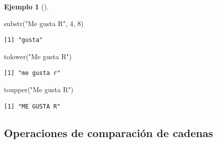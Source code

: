 \documentclass[
  a4paper,
]{scrreport}
\newenvironment{Shaded}{\begin{snugshade}}{\end{snugshade}}
\newcommand{\DecValTok}[1]{\textcolor[rgb]{0.68,0.00,0.00}{#1}}
\newcommand{\FunctionTok}[1]{\textcolor[rgb]{0.28,0.35,0.67}{#1}}
\newcommand{\NormalTok}[1]{\textcolor[rgb]{0.00,0.23,0.31}{#1}}
\newcommand{\StringTok}[1]{\textcolor[rgb]{0.13,0.47,0.30}{#1}}
\theoremstyle{definition}
\newtheorem{example}{Ejemplo}[chapter]
\theoremstyle{definition}
\theoremstyle{remark}
\begin{document}
\begin{example}[]
\begin{Shaded}
\begin{Highlighting}[]
\FunctionTok{substr}\NormalTok{(}\StringTok{"Me gusta R"}\NormalTok{, }\DecValTok{4}\NormalTok{, }\DecValTok{8}\NormalTok{)}
\end{Highlighting}
\end{Shaded}

\begin{verbatim}
[1] "gusta"
\end{verbatim}

\begin{Shaded}
\begin{Highlighting}[]
\FunctionTok{tolower}\NormalTok{(}\StringTok{"Me gusta R"}\NormalTok{)}
\end{Highlighting}
\end{Shaded}

\begin{verbatim}
[1] "me gusta r"
\end{verbatim}

\begin{Shaded}
\begin{Highlighting}[]
\FunctionTok{toupper}\NormalTok{(}\StringTok{"Me gusta R"}\NormalTok{)}
\end{Highlighting}
\end{Shaded}

\begin{verbatim}
[1] "ME GUSTA R"
\end{verbatim}

\end{example}

\hypertarget{operaciones-de-comparaciuxf3n-de-cadenas}{%
\subsection{Operaciones de comparación de
cadenas}\label{operaciones-de-comparaciuxf3n-de-cadenas}}
\end{document}
